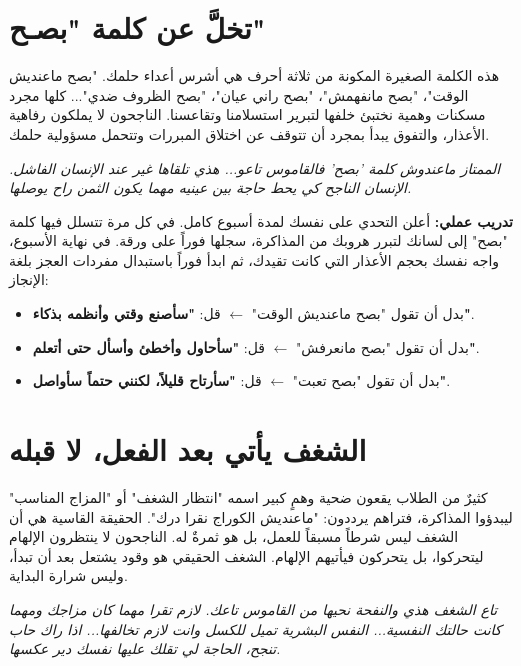 \documentclass[12pt,a4paper]{book}
\newcommand{\quoteAr}[1]{%
	\begin{myquote}
		\itshape #1
	\end{myquote}
}
\newcommand{\exerciseAr}[1]{%
	\begin{exercise}
		\textbf{تدريب عملي:} #1
	\end{exercise}
}
\begin{document}
	\section{تخلَّ عن كلمة "بصـح"}
	\label{sec:owner-experiences2}
	
	هذه الكلمة الصغيرة المكونة من ثلاثة أحرف هي أشرس أعداء حلمك. "بصح ماعنديش الوقت"، "بصح مانفهمش"، "بصح راني عيان"، "بصح الظروف ضدي"... كلها مجرد مسكنات وهمية نختبئ خلفها لتبرير استسلامنا وتقاعسنا. الناجحون لا يملكون رفاهية الأعذار، والتفوق يبدأ بمجرد أن تتوقف عن اختلاق المبررات وتتحمل مسؤولية حلمك.
	
	\quoteAr{الممتاز ماعندوش كلمة 'بصح' فالقاموس تاعو... هذي تلقاها غير عند الإنسان الفاشل. الإنسان الناجح كي يحط حاجة بين عينيه مهما يكون الثمن راح يوصلها.}
	
	\exerciseAr{
		أعلن التحدي على نفسك لمدة أسبوع كامل. في كل مرة تتسلل فيها كلمة "بصح" إلى لسانك لتبرر هروبك من المذاكرة، سجلها فوراً على ورقة. في نهاية الأسبوع، واجه نفسك بحجم الأعذار التي كانت تقيدك، ثم ابدأ فوراً باستبدال مفردات العجز بلغة الإنجاز:
		\begin{itemize}
			\item بدل أن تقول "بصح ماعنديش الوقت" $\leftarrow$ قل: \textbf{"سأصنع وقتي وأنظمه بذكاء"}.
			\item بدل أن تقول "بصح مانعرفش" $\leftarrow$ قل: \textbf{"سأحاول وأخطئ وأسأل حتى أتعلم"}.
			\item بدل أن تقول "بصح تعبت" $\leftarrow$ قل: \textbf{"سأرتاح قليلاً، لكنني حتماً سأواصل"}.
		\end{itemize}
	}
	\section{الشغف يأتي بعد الفعل، لا قبله}
	
	كثيرٌ من الطلاب يقعون ضحية وهمٍ كبير اسمه "انتظار الشغف" أو "المزاج المناسب" ليبدؤوا المذاكرة، فتراهم يرددون: "ماعنديش الكوراج نقرا درك". الحقيقة القاسية هي أن الشغف ليس شرطاً مسبقاً للعمل، بل هو ثمرةٌ له. الناجحون لا ينتظرون الإلهام ليتحركوا، بل يتحركون فيأتيهم الإلهام. الشغف الحقيقي هو وقود يشتعل بعد أن تبدأ، وليس شرارة البداية.
	
	\quoteAr{تاع الشغف هذي والنفحة نحيها من القاموس تاعك. لازم تقرا مهما كان مزاجك ومهما كانت حالتك النفسية... النفس البشرية تميل للكسل وانت لازم تخالفها... اذا راك حاب تنجح، الحاجة لي تقلك عليها نفسك دير عكسها.}
	
\end{document}
